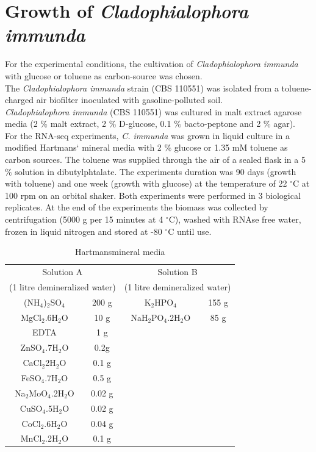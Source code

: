 \documentclass[12pt, a4paper]{report}
\begin{document}
\section{Growth of \textit{Cladophialophora immunda}}
For the experimental conditions, the cultivation of \textit{Cladophialophora immunda} with glucose or toluene as carbon-source was chosen. \\
The \textit{Cladophialophora immunda} strain (CBS 110551) was isolated from a toluene-charged air biofilter inoculated with gasoline-polluted soil. \cite{Prenafeta-Boldu2001} \\
\textit{Cladophialophora immunda} (CBS 110551) was cultured in malt extract agarose media (2 $\%$ malt extract, 2 $\%$ D-glucose, 0.1 $\%$ bacto-peptone and 2 $\%$ agar). \\
For the RNA-seq experiments, \textit{C. immunda} was grown in liquid culture in a modified Hartmans` mineral media with 2 $\%$ glucose or 1.35 mM toluene as carbon sources. \cite{Hartmans1991} The toluene was supplied through the air of a sealed flask in a 5 $\%$ solution in dibutylphtalate. The experiments duration was 90 days (growth with toluene) and one week (growth with glucose) at the temperature of 22 $^\circ$C at 100 rpm on an orbital shaker. Both experiments were performed in 3 biological replicates. At the end of the experiments the biomass was collected by centrifugation (5000 g per 15 minutes at 4 $^\circ$C), washed with RNAse free water, frozen in liquid nitrogen and stored at -80 $^\circ$C until use. \\

\begin{table}[h]
	\centering
	\begin{tabular}{c c | c c}
		\multicolumn{2}{c|}{Solution A} & \multicolumn{2}{c}{Solution B}  \\
		\multicolumn{2}{c|}{(1 litre demineralized water)}  & \multicolumn{2}{c}{(1 litre demineralized water)} \\
		\hline
		(NH$_4$)$_2$SO$_4$ & 200 g & K$_2$HPO$_4$ & 155 g\\
		MgCl$_2$.6H$_2$O & 10 g & NaH$_2$PO$_4$.2H$_2$O & 85 g \\
		EDTA & 1 g & &  \\
		ZnSO$_4$.7H$_2$O & 0.2g & & \\
		CaCl$_2$2H$_2$O & 0.1 g & & \\
		FeSO$_4$.7H$_2$O & 0.5 g & & \\
		Na$_2$MoO$_4$.2H$_2$O & 0.02 g & &\\                                
		CuSO$_4$.5H$_2$O & 0.02 g & & \\
		CoCl$_2$.6H$_2$O & 0.04 g & & \\
		MnCl$_2$.2H$_2$O & 0.1 g & & \\                          
	\end{tabular}
	\caption{Hartmans\textquotesingle mineral media}
\end{table}
\end{document}
